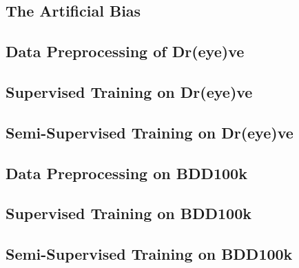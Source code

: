 \subsection{The Artificial Bias}
\subsection{Data Preprocessing of Dr(eye)ve}
\subsection{Supervised Training on Dr(eye)ve}
\subsection{Semi-Supervised Training on Dr(eye)ve}
\subsection{Data Preprocessing on BDD100k}
\subsection{Supervised Training on BDD100k}
\subsection{Semi-Supervised Training on BDD100k}